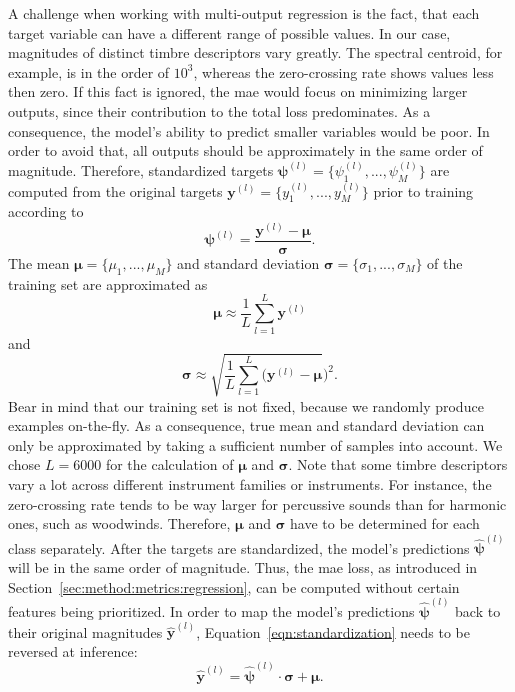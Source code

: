 A challenge when working with multi-output regression is the fact, that each target variable can have a different range of possible values. In our case, magnitudes of distinct timbre descriptors vary greatly. The spectral centroid, for example, is in the order of $10^3$, whereas the zero-crossing rate shows values less then zero. If this fact is ignored, the \gls{mae} would focus on minimizing larger outputs, since their contribution to the total loss predominates. As a consequence, the model's ability to predict smaller variables would be poor. In order to avoid that, all outputs should be approximately in the same order of magnitude. Therefore, standardized targets $\boldsymbol{\psi}^{(l)} = \{ \psi_1^{(l)},...,\psi_M^{(l)} \}$ are computed from the original targets $\boldsymbol{y}^{(l)} = \{ y_1^{(l)},...,y_M^{(l)} \}$ prior to training according to
\begin{equation}
\label{eqn:standardization}
\boldsymbol{\psi}^{(l)} = \frac{\boldsymbol{y}^{(l)} - \boldsymbol{\mu}}{\boldsymbol{\sigma}}.
\end{equation}
The mean $\boldsymbol{\mu} = \{ \mu_1,...,\mu_M \}$ and standard deviation $\boldsymbol{\sigma} = \{ \sigma_1,...,\sigma_M \}$ of the training set are approximated as
\begin{equation}
\boldsymbol{\mu} \approx \frac{1}{L} \sum_{l=1}^{L} \boldsymbol{y}^{(l)}
\end{equation}
and
\begin{equation}
\boldsymbol{\sigma} \approx \sqrt{ \frac{1}{L} \sum_{l=1}^{L} (\boldsymbol{y}^{(l)} - \boldsymbol{\mu}})^2.
\end{equation}
Bear in mind that our training set is not fixed, because we randomly produce examples on-the-fly. As a consequence, true mean and standard deviation can only be approximated by taking a sufficient number of samples into account. We chose $L=6000$ for the calculation of $\boldsymbol{\mu}$ and $\boldsymbol{\sigma}$. Note that some timbre descriptors vary a lot across different instrument families or instruments. For instance, the zero-crossing rate tends to be way larger for percussive sounds than for harmonic ones, such as woodwinds. Therefore, $\boldsymbol{\mu}$ and $\boldsymbol{\sigma}$ have to be determined for each class separately. After the targets are standardized, the model's predictions $\boldsymbol{\hat{\psi}}^{(l)}$ will be in the same order of magnitude. Thus, the \gls{mae} loss, as introduced in Section~\ref{sec:method:metrics:regression}, can be computed without certain features being prioritized. In order to map the model's predictions $\boldsymbol{\hat{\psi}}^{(l)}$ back to their original magnitudes $\boldsymbol{\hat{y}}^{(l)}$, Equation~\ref{eqn:standardization} needs to be reversed at inference: 
\begin{equation}
\boldsymbol{\hat{y}}^{(l)} = \boldsymbol{\hat{\psi}}^{(l)} \cdot \boldsymbol{\sigma} + \boldsymbol{\mu}.
\end{equation}

